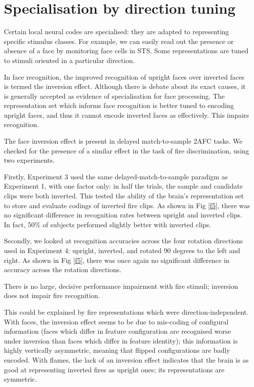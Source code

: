 \documentclass[a4paper]{article}
\begin{document}
\section{Specialisation by direction tuning}

Certain local neural codes are specialised: they are adapted to representing specific stimulus classes. For example, we can easily read out the presence or absence of a face by monitoring face cells in STS\cite{tsao2008patches}. Some representations are tuned to stimuli oriented in a particular direction.

In face recognition, the improved recognition of upright faces over inverted faces is termed the inversion effect\cite{valentine1988upside}. Although there is debate about its exact causes\cite{farah1995causes}, it is generally accepted as evidence of specialisation for face processing. The representation set which informs face recognition is better tuned to encoding upright faces, and thus it cannot encode inverted faces as effectively. This impairs recognition.

The face inversion effect is present in delayed match-to-sample 2AFC tasks\cite{yin1969looking}. We checked for the presence of a similar effect in the task of fire discrimination, using two experiments. 

Firstly, Experiment 3 used the same delayed-match-to-sample paradigm as Experiment 1, with one factor only: in half the trials, the sample and candidate clips were both inverted. This tested the ability of the brain's representation set to store and evaluate codings of inverted fire clips. As shown in Fig \ref{f5}, there was no significant difference in recognition rates between upright and inverted clips. In fact, 50\% of subjects performed slightly better with inverted clips.

Secondly, we looked at recognition accuracies across the four rotation directions used in Experiment 4: upright, inverted, and rotated 90 degrees to the left and right. As shown in Fig \ref{f5}, there was once again no significant difference in accuracy across the rotation directions. 

There is no large, decisive performance impairment with fire stimuli; inversion does not impair fire recognition.

This could be explained by fire representations which were direction-independent. With faces, the inversion effect seems to be due to mis-coding of configural information (faces which differ in feature configuration are recognised worse under inversion than faces which differ in feature identity\cite{freire2000face}); this information is highly vertically asymmetric, meaning that flipped configurations are badly encoded. With flames, the lack of an inversion effect indicates that the brain is as good at representing inverted fires as upright ones; its representations are symmetric. 
\end{document}
